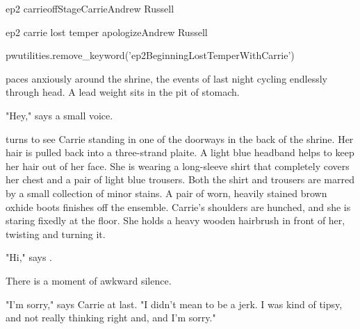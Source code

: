 \documentclass{book}
\begin{document}
\begin{node}{ep2 carrie}{offStage}{Carrie}{Andrew Russell}



\end{node}

\begin{childnode}{ep2 carrie lost temper apologize}{Andrew Russell}

    \begin{code}

        pwutilities.remove_keyword('ep2BeginningLostTemperWithCarrie')

    \end{code}

    \name{} paces anxiously around the shrine, the events of last night cycling endlessly through \hisher{} head. A lead weight sits in the pit of \hisher{} stomach.

    "Hey," says a small voice.

    \name{} turns to see Carrie standing in one of the doorways in the back of the shrine. Her hair is pulled back into a three-strand plaite. A light blue headband helps to keep her hair out of
    her face. She is wearing a long-sleeve shirt that completely 
    covers her chest and a pair of light blue trousers. Both the shirt and trousers are marred by a small collection of minor stains. A pair of worn, heavily stained brown oxhide 
    boots finishes off the ensemble. Carrie's shoulders are hunched, and she is staring fixedly at the floor. She holds a heavy wooden hairbrush in front of her, twisting and turning it.

    "Hi," says \name{}.

    There is a moment of awkward silence.

    "I'm sorry," says Carrie at last. "I didn't mean to be a jerk. I was kind of tipsy, and not really thinking right and, and I'm sorry."



\end{childnode}
\end{document}
